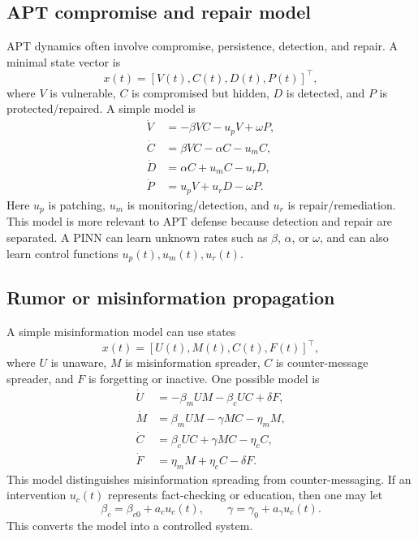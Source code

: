 \documentclass[11pt,a4paper]{article}
\begin{document}
\subsection{APT compromise and repair model}
APT dynamics often involve compromise, persistence, detection, and repair. A minimal state vector is
\begin{equation}
    x(t)=[V(t),C(t),D(t),P(t)]^\top,
\end{equation}
where $V$ is vulnerable, $C$ is compromised but hidden, $D$ is detected, and $P$ is protected/repaired. A simple model is
\begin{align}
    \dot{V} &= -\beta V C - u_p V + \omega P,\\
    \dot{C} &= \beta V C - \alpha C - u_m C,\\
    \dot{D} &= \alpha C + u_m C - u_r D,\\
    \dot{P} &= u_p V + u_r D - \omega P.
\end{align}
Here $u_p$ is patching, $u_m$ is monitoring/detection, and $u_r$ is repair/remediation. This model is more relevant to APT defense because detection and repair are separated. A PINN can learn unknown rates such as $\beta$, $\alpha$, or $\omega$, and can also learn control functions $u_p(t),u_m(t),u_r(t)$.

\subsection{Rumor or misinformation propagation}
A simple misinformation model can use states
\begin{equation}
    x(t)=[U(t),M(t),C(t),F(t)]^\top,
\end{equation}
where $U$ is unaware, $M$ is misinformation spreader, $C$ is counter-message spreader, and $F$ is forgetting or inactive. One possible model is
\begin{align}
    \dot{U} &= -\beta_m U M -\beta_c U C + \delta F,\\
    \dot{M} &= \beta_m U M - \gamma M C - \eta_m M,\\
    \dot{C} &= \beta_c U C + \gamma M C - \eta_c C,\\
    \dot{F} &= \eta_m M + \eta_c C - \delta F.
\end{align}
This model distinguishes misinformation spreading from counter-messaging. If an intervention $u_c(t)$ represents fact-checking or education, then one may let
\begin{equation}
    \beta_c=\beta_{c0}+a_c u_c(t), \qquad \gamma=\gamma_0+a_\gamma u_c(t).
\end{equation}
This converts the model into a controlled system.
\end{document}
